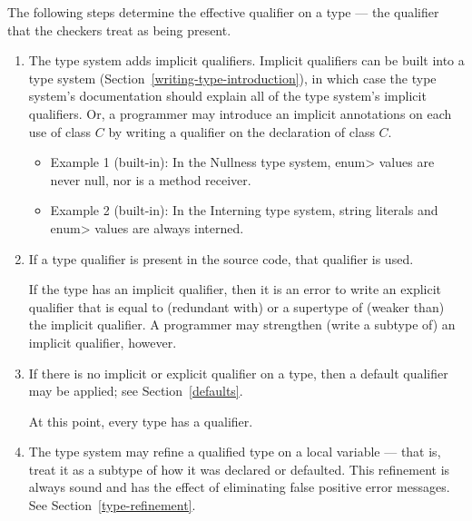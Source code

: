   The following steps determine the effective
qualifier on a type --- the qualifier that the checkers treat as being present.

\begin{enumerate}
\item
  The type system adds implicit qualifiers.  Implicit qualifiers can be
  built into a type system (Section~\ref{writing-type-introduction}), in
  which case the type system's documentation should explain all of the type
  system's implicit qualifiers.  Or, a programmer may introduce an implicit
  annotations on each use of class $C$ by writing a qualifier on the
  declaration of class $C$.

\begin{itemize}
\item
  Example 1 (built-in):  In the Nullness type system,
  \<enum> values are never null, nor is a method receiver.
\item
  Example 2 (built-in):  In the Interning type system, string literals
  and \<enum> values are always interned.
\end{itemize}

\item
  If a type qualifier is present in the source code, that qualifier is used.

  If the type has an implicit qualifier, then it is an error to write an
  explicit qualifier that is equal to (redundant with) or a supertype of
  (weaker than) the implicit qualifier.  A programmer may strengthen
  (write a subtype of) an implicit qualifier, however.

\item
  If there is no implicit or explicit qualifier on a type, then a default
  qualifier may be applied; see Section~\ref{defaults}.  

  \smallskip

  At this point, every type has a qualifier.

\item
  The type system may refine a qualified type on a local variable --- that
  is, treat it as a subtype of how it was declared or defaulted.  This
  refinement is always sound and has the effect of eliminating false
  positive error messages.  See Section~\ref{type-refinement}.


\end{enumerate}



